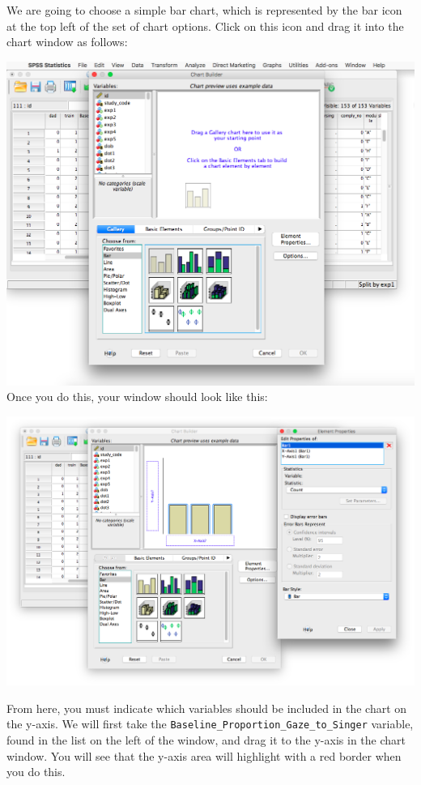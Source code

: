 \documentclass[
]{book}
\begin{document}
We are going to choose a simple bar chart, which is represented by the bar icon at the top left of the set of chart options. Click on this icon and drag it into the chart window as follows:

\includegraphics{img/6.4.22.png}
Once you do this, your window should look like this:

\includegraphics{img/6.4.23.png}

From here, you must indicate which variables should be included in the chart on the y-axis. We will first take the \texttt{Baseline\_Proportion\_Gaze\_to\_Singer} variable, found in the list on the left of the window, and drag it to the y-axis in the chart window. You will see that the y-axis area will highlight with a red border when you do this.
\end{document}
